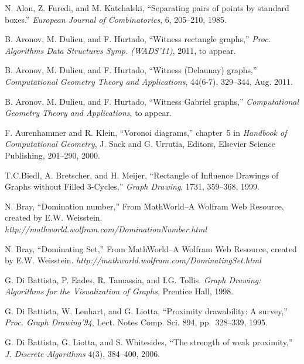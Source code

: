 \documentclass{llncs}
\begin{document}
\begin{thebibliography}{99}



 N. Alon, Z. Furedi, and M. Katchalski,
``Separating pairs of  points by standard boxes.''
\emph{European Journal of Combinatorics},
6, 205--210, 1985.

 B. Aronov, M. Dulieu, and F. Hurtado, ``Witness
  rectangle graphs,'' \emph{Proc. Algorithms Data Structures
    Symp. (WADS'11)}, 2011, to appear.

 B. Aronov, M. Dulieu, and F. Hurtado, ``Witness
  (Delaunay) graphs,'' \emph{Computational Geometry Theory and Applications}, 44(6-7),
  329--344, Aug. 2011.
  


 B. Aronov, M. Dulieu, and F. Hurtado, ``Witness Gabriel
  graphs,''  \emph{Computational Geometry Theory and Applications}, to appear.


 F. Aurenhammer and R. Klein, ``Voronoi
  diagrams,'' chapter~5 in \emph{Handbook of Computational Geometry},
  J. Sack and G. Urrutia, Editors, Elsevier Science Publishing,
  201--290, 2000.
  
   T.C.Biedl, A. Bretscher, and H. Meijer,
  ``Rectangle of Influence Drawings of Graphs without Filled 3-Cycles,''
  \emph{Graph Drawing},
  1731, 359--368, 1999.
  
     N. Bray, ``Domination number,'' From
  MathWorld--A Wolfram Web
  Resource, created by E.W. Weisstein. \textsl{http://mathworld.wolfram.com/DominationNumber.html}
  
      N. Bray, ``Dominating Set,'' From
  MathWorld--A Wolfram Web
  Resource, created by E.W. Weisstein. \textsl{http://mathworld.wolfram.com/DominatingSet.html}

G. Di Battista, P. Eades, R. Tamassia, and I.G. Tollis.
\newblock \emph{Graph Drawing: Algorithms for the Visualization of Graphs},
\newblock Prentice Hall, 1998.

 G. Di Battista, W. Lenhart, and G. Liotta, ``Proximity
  drawability: A survey,'' \emph{Proc. Graph Drawing'94}, Lect. Notes
  Comp. Sci. 894, pp.~328--339, 1995.

  G. Di Battista, G. Liotta, and S. Whitesides,
``The strength of weak proximity,''
\emph{J. Discrete Algorithms} 4(3), 384--400, 2006.


\end{thebibliography}
\end{document}
